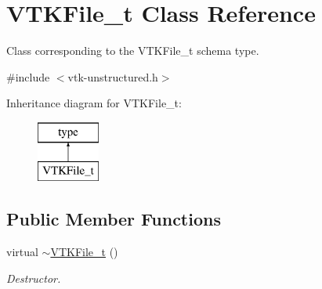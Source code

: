 \hypertarget{classVTKFile__t}{\section{V\-T\-K\-File\-\_\-t Class Reference}
\label{classVTKFile__t}
}


Class corresponding to the V\-T\-K\-File\-\_\-t schema type.  




{\ttfamily \#include $<$vtk-\/unstructured.\-h$>$}

Inheritance diagram for V\-T\-K\-File\-\_\-t\-:\begin{figure}[H]
\begin{center}
\leavevmode
\includegraphics[height=2.000000cm]{classVTKFile__t}
\end{center}
\end{figure}
\subsection*{Public Member Functions}
\begin{DoxyCompactItemize}
\item 
virtual \hyperlink{classVTKFile__t_ac5cf95c81660088dbb3c9ab6cd78dede}{$\sim$\-V\-T\-K\-File\-\_\-t} ()
\begin{DoxyCompactList}\small\item\em Destructor. \end{DoxyCompactList}\end{DoxyCompactItemize}
